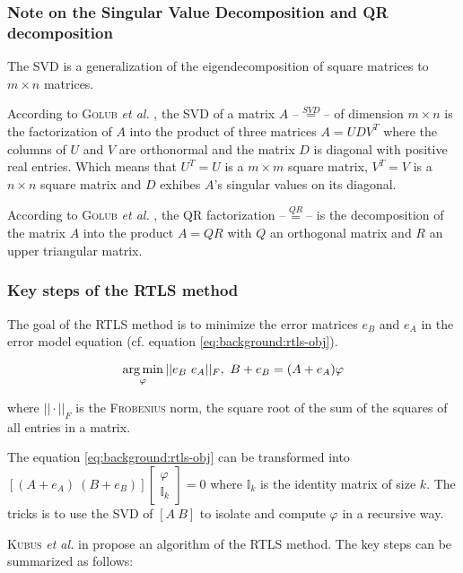 \documentclass[/home/francois/latex/report/main.tex]{subfiles}
\begin{document}
\subsubsection{Note on the Singular Value Decomposition and QR decomposition}

The \ac{SVD} is a generalization of the eigendecomposition of square matrices to $m \times n$ matrices.

According to \textsc{Golub} \textit{et al.} \cite{Golub1965}, the \ac{SVD} of a matrix $A$ –$\overset{SVD}{=}$– of dimension $m \times n$ is the factorization of $A$ into the product of three matrices $A = UDV^T$ where the columns of $U$ and $V$ are orthonormal and the matrix $D$ is diagonal with positive real entries. Which means that $U^T = U$ is a $m \times m$ square matrix, $V^T = V$ is a $n \times n$ square matrix and $D$ exhibes $A$'s singular values on its diagonal.

According to \textsc{Golub} \textit{et al.} \cite{Golub1996}, the QR factorization –$\overset{QR}{=}$– is the decomposition of the matrix $A$ into the product $A = QR$ with $Q$ an orthogonal matrix and $R$ an upper triangular matrix.

\subsubsection{Key steps of the \ac{RTLS} method}

The goal of the \ac{RTLS} method is to minimize the error matrices $e_B$ and $e_A$ in the error model equation (cf. equation \ref{eq:background:rtls-obj}).

\begin{equation}
  \label{eq:background:rtls-obj}
  \operatorname*{arg\,min}_{\varphi} ||e_B \ e_A||_F, \ B + e_B = (A + e_A) \varphi
\end{equation}

where $|| \cdot ||_F$ is the \textsc{Frobenius} norm, the square root of the sum of the squares of all entries in a matrix.

The equation \ref{eq:background:rtls-obj} can be transformed into $[(A + e_A) \ (B + e_B)]\begin{bmatrix}\varphi \\ \mathbb{I}_k\end{bmatrix} = 0$ where $\mathbb{I}_k$ is the identity matrix of size $k$. The tricks is to use the \ac{SVD} of $[A \ B]$ to isolate and compute $\varphi$ in a recursive way.

\textsc{Kubus} \textit{et al.} in \cite{Kubus2008} propose an algorithm of the \ac{RTLS} method. The key steps can be summarized as follows:
\end{document}
